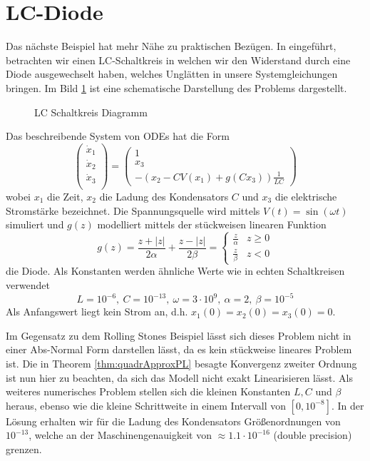 \section{LC-Diode}
Das nächste Beispiel hat mehr Nähe zu praktischen Bezügen. In \cite{boeck2014experiments} eingeführt, betrachten wir einen LC-Schaltkreis in welchen wir den Widerstand durch eine Diode ausgewechselt haben, welches Unglätten in unsere Systemgleichungen bringen. Im Bild \ref{fig:lcDiode} ist eine schematische Darstellung des Problems dargestellt. 
\begin{figure}[H]
\centering

\caption{LC Schaltkreis Diagramm}
\label{fig:lcDiode}
\end{figure}
Das beschreibende System von ODEs hat die Form
\[
 \begin{pmatrix}
  \dot x_1\\
  \dot x_2\\
  \dot x_3\\
 \end{pmatrix}
 = 
 \begin{pmatrix}
  1\\
  x_3\\
  -\left(x_2-CV(x_1) + g(Cx_3)\right)\frac{1}{LC}
 \end{pmatrix}
\]
wobei $x_1$ die Zeit, $x_2$ die Ladung des Kondensators $C$ und $x_3$ die elektrische Stromstärke bezeichnet. Die Spannungsquelle wird mittels $V(t)=\sin(\omega t)$ simuliert und $g(z)$ modelliert mittels der stückweisen linearen Funktion 
\begin{equation}
 g(z) = \frac{z+|z|}{2\alpha} + \frac{z-|z|}{2\beta}  = \begin{cases}
                                                         \frac{z}{\alpha} & z\geq 0\\
                                                         \frac{z}{\beta}  & z<0
                                                        \end{cases}
\label{eq:lcOde}                                                       
\end{equation}
die Diode. Als Konstanten werden ähnliche Werte wie in echten Schaltkreisen verwendet
\[
 L= 10^{-6},~ C=10^{-13},~ \omega = 3\cdot 10^{9},~\alpha = 2,~\beta = 10^{-5}
\]
Als Anfangswert liegt kein Strom an, d.h. $x_1(0)  = x_2(0) = x_3(0) = 0$.

Im Gegensatz zu dem Rolling Stones Beispiel lässt sich dieses Problem nicht in einer Abs-Normal Form darstellen lässt, da es kein stückweise lineares Problem ist. Die in Theorem \ref{thm:quadrApproxPL} besagte Konvergenz zweiter Ordnung ist nun hier zu beachten, da sich das Modell nicht exakt Linearisieren lässt. Als weiteres numerisches Problem stellen sich die kleinen Konstanten $L,C$ und $\beta$ heraus, ebenso wie die kleine Schrittweite in einem Intervall von $[0, 10^{-8}]$. In der Lösung erhalten wir für die Ladung des Kondensators Größenordnungen von $10^{-13}$, welche an der Maschinengenauigkeit von $\approx 1.1\cdot 10^{-16}$ (double precision) grenzen.

